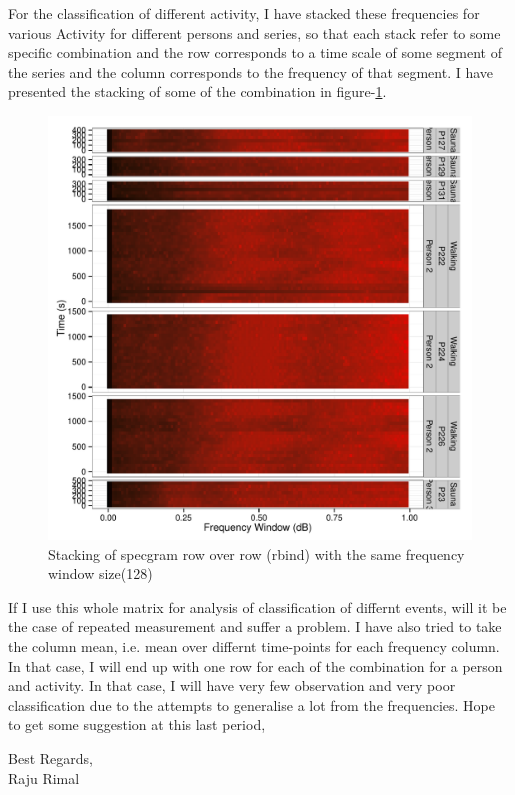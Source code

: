 \documentclass[11pt]{article}\usepackage[]{graphicx}\usepackage[]{color}
\newenvironment{knitrout}{}{} %
\begin{document}
For the classification of different activity, I have stacked these frequencies for various Activity for different persons and series, so that each stack refer to some specific combination and the row corresponds to a time scale of some segment of the series and the column corresponds to the frequency of that segment. I have presented the stacking of some of the combination in figure-\ref{fig:SpecGramStack}.

\begin{knitrout}
\color{fgcolor}\begin{figure}[H]
\includegraphics[width=\textwidth,height=0.83\textheight]{figure/SpecGramStack-1} \caption[Stacking of specgram row over row (rbind) with the same frequency window size(128)]{Stacking of specgram row over row (rbind) with the same frequency window size(128)}\label{fig:SpecGramStack}
\end{figure}


\end{knitrout}

If I use this whole matrix for analysis of classification of differnt events, will it be the case of repeated measurement and suffer a problem. I have also tried to take the column mean, i.e. mean over differnt time-points for each frequency column. In that case, I will end up with one row for each of the combination for a person and activity. In that case, I will have very few observation and very poor classification due to the attempts to generalise a lot from the frequencies. Hope to get some suggestion at this last period,

\vspace{2cm}
\noindent Best Regards, \\
Raju Rimal
\end{document}
